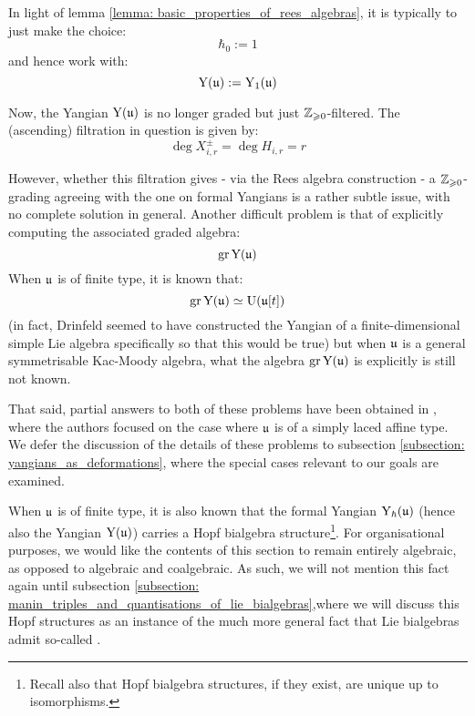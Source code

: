         \begin{convention}
            In light of lemma \ref{lemma: basic_properties_of_rees_algebras}, it is typically to just make the choice:
                $$\hbar_0 := 1$$
            and hence work with:
                $$\mathrm{Y}(\mathfrak{u}) := \mathrm{Y}_1(\mathfrak{u})$$
        \end{convention}
        \begin{remark} \label{remark: positive_Z_filtrations_on_yangians}
            Now, the Yangian $\mathrm{Y}(\mathfrak{u})$ is no longer graded but just $\mathbb{Z}_{\geqslant 0}$-filtered. The (ascending) filtration in question is given by:
                $$\deg X_{i, r}^{\pm} = \deg H_{i, r} = r$$
                
            However, whether this filtration gives - via the Rees algebra construction - a $\mathbb{Z}_{\geqslant 0}$-grading agreeing with the one on formal Yangians is a rather subtle issue, with no complete solution in general. Another difficult problem is that of explicitly computing the associated graded algebra:
                $$\operatorname{gr} \mathrm{Y}(\mathfrak{u})$$
            When $\mathfrak{u}$ is of finite type, it is known that:
                $$\operatorname{gr} \mathrm{Y}(\mathfrak{u}) \simeq \mathrm{U}(\mathfrak{u}[t])$$
            (in fact, Drinfeld seemed to have constructed the Yangian of a finite-dimensional simple Lie algebra specifically so that this would be true) but when $\mathfrak{u}$ is a general symmetrisable Kac-Moody algebra, what the algebra $\operatorname{gr} \mathrm{Y}(\mathfrak{u})$ is explicitly is still not known.
            
            That said, partial answers to both of these problems have been obtained in \cite[Section 6]{guay_nakajima_wendlandt_affine_yangian_vertex_representations_and_PBW}, where the authors focused on the case where $\mathfrak{u}$ is of a simply laced affine type. We defer the discussion of the details of these problems to subsection \ref{subsection: yangians_as_deformations}, where the special cases relevant to our goals are examined. 
        \end{remark}

        \begin{remark}
            When $\mathfrak{u}$ is of finite type, it is also known that the formal Yangian $\mathrm{Y}_{\hbar}(\mathfrak{u})$ (hence also the Yangian $\mathrm{Y}(\mathfrak{u})$) carries a Hopf bialgebra structure\footnote{Recall also that Hopf bialgebra structures, if they exist, are unique up to isomorphisms.}. For organisational purposes, we would like the contents of this section to remain entirely algebraic, as opposed to algebraic and coalgebraic. As such, we will not mention this fact again until subsection \ref{subsection: manin_triples_and_quantisations_of_lie_bialgebras},where we will discuss this Hopf structures as an instance of the much more general fact that Lie bialgebras admit so-called . 
        \end{remark}

